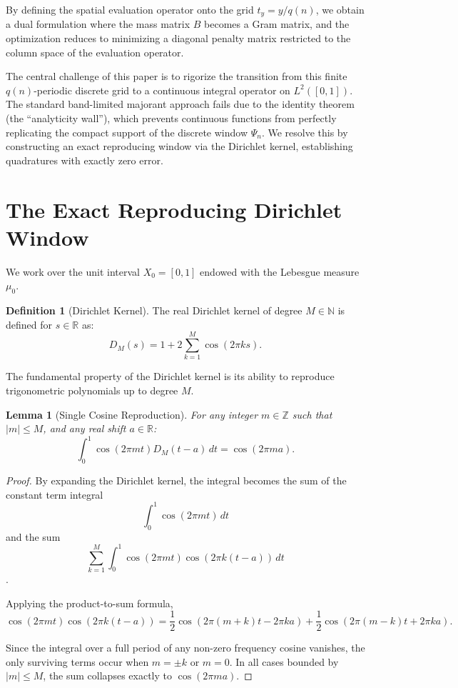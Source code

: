 \documentclass{aomart}
\newtheorem{lemma}[theorem]{Lemma}
\theoremstyle{definition}
\newtheorem{definition}[theorem]{Definition}
\newcommand{\mathbbR}{\mathbb{R}}
\newcommand{\mathbbN}{\mathbb{N}}
\newcommand{\mathbbZ}{\mathbb{Z}}
\begin{document}
By defining the spatial evaluation operator onto the grid $t_y = y / q(n)$, we obtain a dual
formulation where the mass matrix $B$ becomes a Gram matrix, and the optimization reduces to
minimizing a diagonal penalty matrix restricted to the column space of the evaluation operator. 

The central challenge of this paper is to rigorize the transition from this finite $q(n)$-periodic
discrete grid to a continuous integral operator on $L^2([0,1])$. The standard band-limited
majorant approach fails due to the identity theorem (the ``analyticity wall''), which prevents
continuous functions from perfectly replicating the compact support of the discrete window
$\Psi_n$. We resolve this by constructing an exact reproducing window via the Dirichlet kernel,
establishing quadratures with exactly zero error.

\section{The Exact Reproducing Dirichlet Window} \label{sec:dirichlet}

We work over the unit interval $X_0 = [0,1]$ endowed with the Lebesgue measure $\mu_0$. 

\begin{definition}[Dirichlet Kernel]
The real Dirichlet kernel of degree $M \in \mathbbN$ is defined for $s \in \mathbbR$ as:
\[ D_M(s) = 1 + 2 \sum_{k=1}^M \cos(2\pi k s). \]
\end{definition}

The fundamental property of the Dirichlet kernel is its ability to reproduce trigonometric
polynomials up to degree $M$.

\begin{lemma}[Single Cosine Reproduction] \label{lem:dirichlet_cos}
For any integer $m \in \mathbbZ$ such that $|m| \le M$, and any real shift $a \in \mathbbR$:
\[ \int_{0}^{1} \cos(2\pi m t) D_M(t - a) \, dt = \cos(2\pi m a). \]
\end{lemma}
\begin{proof}
By expanding the Dirichlet kernel, the integral becomes the sum of the constant term integral
\[ \int_0^1 \cos(2\pi m t) \, dt \] and the sum
\[ \sum_{k=1}^M \int_0^1 \cos(2\pi m t) \cos(2\pi k (t - a)) \, dt \].

Applying the product-to-sum formula,
\[ \cos(2\pi m t) \cos(2\pi k (t - a)) = \frac{1}{2} \cos(2\pi (m+k) t - 2\pi k a) +
\frac{1}{2} \cos(2\pi (m-k) t + 2\pi k a). \]

Since the integral over a full period of any non-zero frequency cosine vanishes, the only
surviving terms occur when $m = \pm k$ or $m = 0$. In all cases bounded by $|m| \le M$, the
sum collapses exactly to $\cos(2\pi m a)$.
\end{proof}
\end{document}

